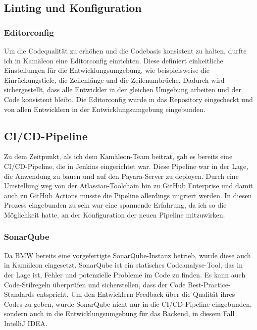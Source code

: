 \documentclass[11pt, a4paper, oneside]{scrartcl}
\begin{document}
        \subsection{Linting und Konfiguration}
            \subsubsection{Editorconfig}
            Um die Codequalität zu erhöhen und die Codebasis konsistent zu halten, durfte ich in
            Kamäleon eine Editorconfig einrichten.
            Diese definiert einheitliche Einstellungen für die Entwicklungsumgebung, wie
            beispielsweise die Einrückungstiefe, die Zeilenlänge und die Zeilenumbrüche.
            Dadurch wird sichergestellt, dass alle Entwickler in der gleichen Umgebung arbeiten und
            der Code konsistent bleibt.
            Die Editorconfig wurde in das Repository eingecheckt und von allen Entwicklern in der
            Entwicklungsumgebung eingebunden.

            \subsection{CI/CD-Pipeline}
            Zu dem Zeitpunkt, als ich dem Kamäleon-Team beitrat, gab es bereits eine CI/CD-Pipeline,
            die in Jenkins eingerichtet war.
            Diese Pipeline war in der Lage, die Anwendung zu bauen und auf den Payara-Server zu
            deployen.
            Durch eine Umstellung weg von der Atlassian-Toolchain hin zu GitHub Enterprise und damit
            auch zu GitHub Actions musste die Pipeline allerdings migriert werden.
            In diesen Prozess eingebunden zu sein war eine spannende Erfahrung,
            da ich so die Möglichkeit hatte, an der Konfiguration der neuen Pipeline mitzuwirken.

            \subsubsection{SonarQube}
            Da BMW bereits eine vorgefertigte SonarQube-Instanz betrieb,
            wurde diese auch in Kamäleon eingesetzt.
            SonarQube ist ein statisches Codeanalyse-Tool, das in der Lage ist,
            Fehler und potenzielle Probleme im Code zu finden.
            Es kann auch Code-Stilregeln überprüfen und sicherstellen,
            dass der Code Best-Practice-Standards entspricht.
            Um den Entwicklern Feedback über die Qualität ihres Codes zu geben,
            wurde SonarQube nicht nur in die CI/CD-Pipeline eingebunden,
            sondern auch in die Entwicklungsumgebung für das Backend, in diesem Fall IntelliJ IDEA.
\end{document}
